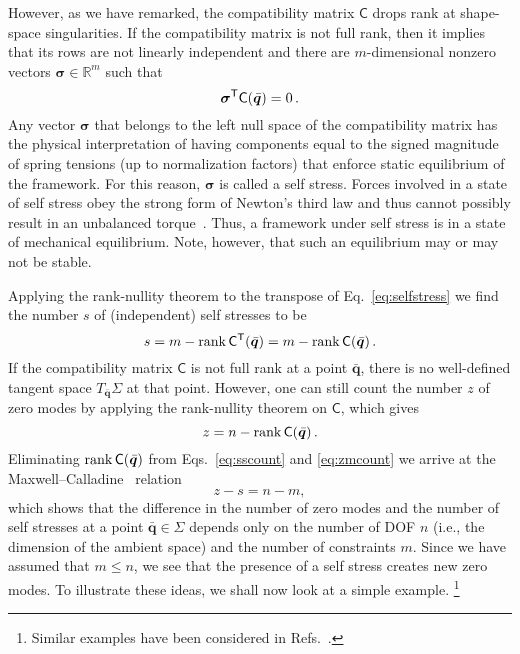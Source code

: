 However, as we have remarked, the compatibility matrix $\mathsf{C}$ drops rank at shape-space singularities.
If the compatibility matrix is not full rank, then it implies that its rows are not linearly independent and there are $m$-dimensional nonzero vectors $\bm{\sigma} \in \mathbb{R}^m$ such that
%
\begin{equation}
  \bm{\sigma}^\mathsf{T}\mathsf{C}(\bar{\bm{q}}) = 0\,.\label{eq:selfstress}
\end{equation}
%
Any vector $\bm{\sigma}$ that belongs to the left null space of the compatibility matrix has the physical interpretation of having components equal to the signed magnitude of spring tensions (up to normalization factors) that enforce static equilibrium of the framework.
For this reason, $\bm{\sigma}$ is called a self stress.
Forces involved in a state of self stress obey the strong form of Newton's third law and thus cannot possibly result in an unbalanced torque~\cite{goldstein2002}.
Thus, a framework under self stress is in a state of mechanical equilibrium.
Note, however, that such an equilibrium may or may not be stable.

Applying the rank-nullity theorem to the transpose of Eq.~\eqref{eq:selfstress} we find the number $s$ of (independent) self stresses to be
%
\begin{equation}
  s = m - \operatorname{rank}{\mathsf{C}^\mathsf{T}(\bar{\bm{q}})} = m - \operatorname{rank}{\mathsf{C}(\bar{\bm{q}})}\,.\label{eq:sscount}
\end{equation}
%
If the compatibility matrix $\mathsf{C}$ is not full rank at a point $\bar{\bm{q}}$, there is no well-defined tangent space $T_{\bar{\bm{q}}}\Sigma$ at that point.
However, one can still count the number $z$ of zero modes by applying the rank-nullity theorem on $\mathsf{C}$, which gives
\begin{equation}
  z = n - \operatorname{rank}{\mathsf{C}(\bar{\bm{q}})}\label{eq:zmcount}\,.
\end{equation}
Eliminating $\operatorname{rank}{\mathsf{C}(\bar{\bm{q}})}$ from Eqs.~\eqref{eq:sscount} and \eqref{eq:zmcount} we arrive at the Maxwell--Calladine~\cite{maxwell1864,calladine1978} relation
%
\begin{equation}
  z - s = n - m,
  \label{eq:mcindex}
\end{equation}
%
which shows that the difference in the number of zero modes and the number of self stresses at a point $\bar{\bm{q}} \in \Sigma$ depends only on the number of DOF $n$ (i.e., the dimension of the ambient space) and the number of constraints $m$.
Since we have assumed that $m \leq n$, we see that the presence of a self stress creates new zero modes.
To illustrate these ideas, we shall now look at a simple example.%
\footnote{Similar examples have been considered in Refs.~\cite{calladine1978,lengyel2002,zhang2016,woodhouse2018}.}

